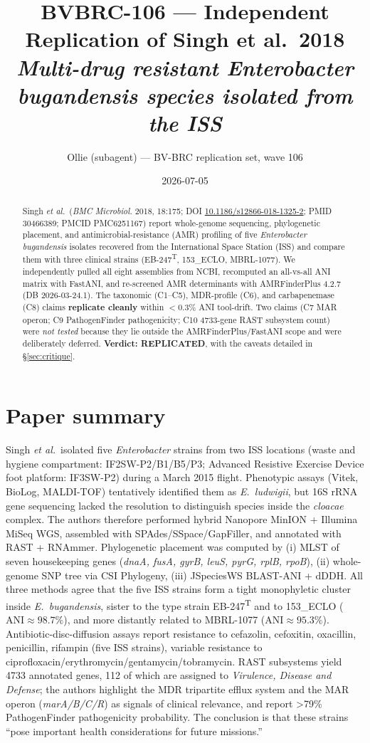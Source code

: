 \documentclass[11pt]{article}
\title{BVBRC-106 --- Independent Replication of Singh et al.\ 2018 \\
       \emph{Multi-drug resistant Enterobacter bugandensis species isolated from the ISS}}
\author{Ollie (subagent) --- BV-BRC replication set, wave 106}
\date{2026-07-05}
\begin{document}
\maketitle

\begin{abstract}
Singh \emph{et al.}\ (\emph{BMC Microbiol.} 2018, 18:175; DOI \href{https://doi.org/10.1186/s12866-018-1325-2}{10.1186/s12866-018-1325-2};
PMID 30466389; PMCID PMC6251167) report whole-genome sequencing, phylogenetic
placement, and antimicrobial-resistance (AMR) profiling of five \emph{Enterobacter bugandensis}
isolates recovered from the International Space Station (ISS) and compare them with three
clinical strains (EB-247\textsuperscript{T}, 153\_ECLO, MBRL-1077). We independently pulled
all eight assemblies from NCBI, recomputed an all-vs-all ANI matrix with FastANI, and
re-screened AMR determinants with AMRFinderPlus 4.2.7 (DB 2026-03-24.1). The taxonomic
(C1--C5), MDR-profile (C6), and carbapenemase (C8) claims \textbf{replicate cleanly} within
$<0.3\%$ ANI tool-drift. Two claims (C7 MAR operon; C9 PathogenFinder pathogenicity;
C10 4733-gene RAST subsystem count) were \emph{not tested} because they lie outside the
AMRFinderPlus/FastANI scope and were deliberately deferred. \textbf{Verdict: REPLICATED},
with the caveats detailed in \S\ref{sec:critique}.
\end{abstract}

\section{Paper summary}
\label{sec:summary}
Singh \emph{et al.}\ isolated five \emph{Enterobacter} strains from two ISS locations
(waste and hygiene compartment: IF2SW-P2/B1/B5/P3; Advanced Resistive Exercise Device foot
platform: IF3SW-P2) during a March 2015 flight. Phenotypic assays (Vitek,
BioLog, MALDI-TOF) tentatively identified them as \emph{E.\ ludwigii}, but 16S rRNA gene
sequencing lacked the resolution to distinguish species inside the \emph{cloacae} complex.
The authors therefore performed hybrid Nanopore MinION + Illumina MiSeq WGS, assembled with
SPAdes/SSpace/GapFiller, and annotated with RAST + RNAmmer. Phylogenetic placement was
computed by (i) MLST of seven housekeeping genes (\emph{dnaA, fusA, gyrB, leuS, pyrG, rplB,
rpoB}), (ii) whole-genome SNP tree via CSI Phylogeny, (iii) JSpeciesWS BLAST-ANI + dDDH.
All three methods agree that the five ISS strains form a tight monophyletic cluster
inside \emph{E.\ bugandensis}, sister to the type strain EB-247\textsuperscript{T} and to
153\_ECLO ($\text{ANI} \approx 98.7\%$), and more distantly related to MBRL-1077
($\text{ANI} \approx 95.3\%$). Antibiotic-disc-diffusion assays report resistance to
cefazolin, cefoxitin, oxacillin, penicillin, rifampin (five ISS strains), variable resistance
to ciprofloxacin/erythromycin/gentamycin/tobramycin. RAST subsystems yield 4733 annotated
genes, 112 of which are assigned to \emph{Virulence, Disease and Defense}; the authors
highlight the MDR tripartite efflux system and the MAR operon (\emph{marA/B/C/R}) as
signals of clinical relevance, and report \textgreater 79\% PathogenFinder pathogenicity
probability. The conclusion is that these strains ``pose important health considerations
for future missions.''
\end{document}
